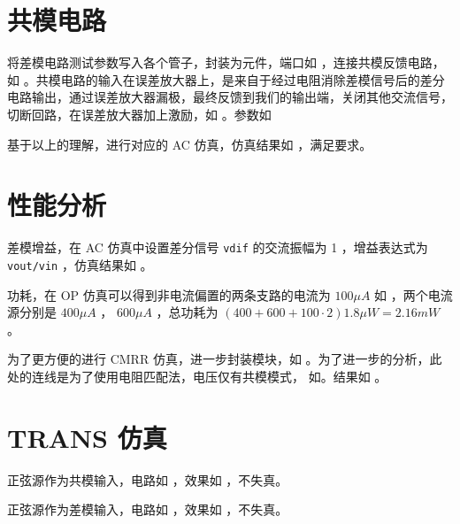 \documentclass[lang=cn,11pt,a4paper,cite=authoryear]{elegantpaper}
\begin{document}

\section{共模电路}

将差模电路测试参数写入各个管子，封装为元件，端口如  ，连接共模反馈电路，如  。共模电路的输入在误差放大器上，是来自于经过电阻消除差模信号后的差分电路输出，通过误差放大器漏极，最终反馈到我们的输出端，关闭其他交流信号，切断回路，在误差放大器加上激励，如 。参数如 




基于以上的理解，进行对应的 AC 仿真，仿真结果如  ，满足要求。


\section{性能分析}

差模增益，在 AC 仿真中设置差分信号 \lstinline{vdif} 的交流振幅为 1 ，增益表达式为 \lstinline{vout/vin} ，仿真结果如  。


功耗，在 OP 仿真可以得到非电流偏置的两条支路的电流为 \(100 \mu A\) 如 ，两个电流源分别是 \(400\mu A\) ， \(600 \mu A\) ，总功耗为 \((400 + 600 + 100 \cdot 2) 1.8 \mu W = 2.16 mW\) 。


为了更方便的进行 CMRR 仿真，进一步封装模块，如  。为了进一步的分析，此处的连线是为了使用电阻匹配法，电压仅有共模模式， 如。结果如  。




\section{TRANS 仿真}

正弦源作为共模输入，电路如  ，效果如  ，不失真。



正弦源作为差模输入，电路如  ，效果如  ，不失真。




\end{document}
